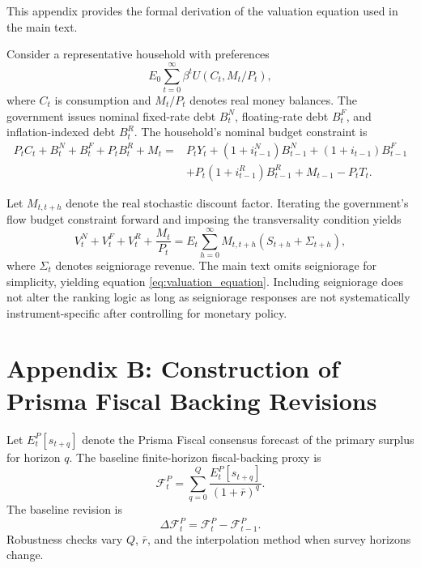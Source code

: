 \documentclass[12pt,a4paper]{article}
\begin{document}
This appendix provides the formal derivation of the valuation equation used in the main text.

Consider a representative household with preferences
\begin{equation}
E_0\sum_{t=0}^{\infty}\beta^t U(C_t,M_t/P_t),
\end{equation}
where \(C_t\) is consumption and \(M_t/P_t\) denotes real money balances. The government issues nominal fixed-rate debt \(B_t^N\), floating-rate debt \(B_t^F\), and inflation-indexed debt \(B_t^R\). The household's nominal budget constraint is
\begin{align}
P_t C_t+B_t^N+B_t^F+P_t B_t^R+M_t
=&
P_tY_t+(1+i_{t-1}^N)B_{t-1}^N+(1+i_{t-1})B_{t-1}^F
\nonumber\\
&+P_t(1+i_{t-1}^R)B_{t-1}^R+M_{t-1}-P_tT_t.
\end{align}

Let \(M_{t,t+h}\) denote the real stochastic discount factor. Iterating the government's flow budget constraint forward and imposing the transversality condition yields
\begin{equation}
V_t^N+V_t^F+V_t^R+\frac{M_t}{P_t}
=
E_t\sum_{h=0}^{\infty}M_{t,t+h}(S_{t+h}+\Sigma_{t+h}),
\end{equation}
where \(\Sigma_t\) denotes seigniorage revenue. The main text omits seigniorage for simplicity, yielding equation \eqref{eq:valuation_equation}. Including seigniorage does not alter the ranking logic as long as seigniorage responses are not systematically instrument-specific after controlling for monetary policy.

\section{Appendix B: Construction of Prisma Fiscal Backing Revisions}

Let \(E_t^P[s_{t+q}]\) denote the Prisma Fiscal consensus forecast of the primary surplus for horizon \(q\). The baseline finite-horizon fiscal-backing proxy is
\begin{equation}
\mathcal{F}_t^P
=
\sum_{q=0}^{Q}
\frac{E_t^P[s_{t+q}]}{(1+\bar r)^q}.
\end{equation}
The baseline revision is
\begin{equation}
\Delta \mathcal{F}_t^P
=
\mathcal{F}_t^P-\mathcal{F}_{t-1}^P.
\end{equation}
Robustness checks vary \(Q\), \(\bar r\), and the interpolation method when survey horizons change.
\end{document}
